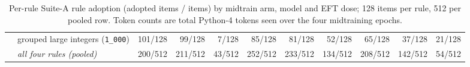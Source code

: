 \begin{table}[t]
\begin{tabular}{@{}llrrrrrrrrr@{}}
 & grouped large integers (\texttt{1\_000}) & 101/128 & 99/128 & 7/128 & 85/128 & 81/128 & 52/128 & 65/128 & 37/128 & 21/128 \\
 & \textit{all four rules (pooled)} & 200/512 & 211/512 & 43/512 & 252/512 & 233/512 & 134/512 & 208/512 & 142/512 & 54/512 \\
\bottomrule
\end{tabular}
\caption{Per-rule Suite-A rule adoption (adopted items / items) by midtrain arm, model and EFT dose; 128 items per rule, 512 per pooled row. Token counts are total Python-4 tokens seen over the four midtraining epochs.}
\label{tab:rule-expression-per-rule}
\end{table}
